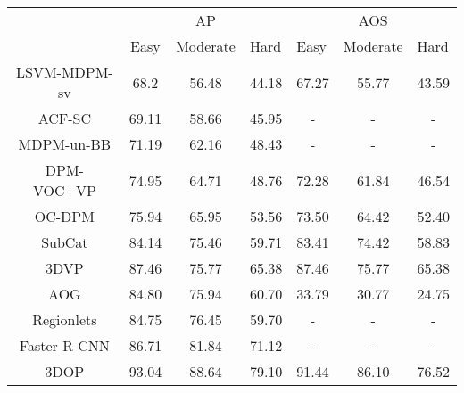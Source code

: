 \documentclass[10pt,twocolumn,letterpaper]{article}
\begin{document}
\begin{table*}[]
\centering

\begin{tabular}{c|c|c|c|l|c|c|}
\cline{2-7}
\multicolumn{1}{l|}{}&\multicolumn{3}{c|}{AP}             & \multicolumn{3}{c|}{AOS}                                                      \\ \cline{2-7} 
                         & Easy & Moderate & \multicolumn{1}{l|}{Hard} & Easy                     & \multicolumn{1}{l|}{Moderate} & \multicolumn{1}{l|}{Hard} \\ \hline
\multicolumn{1}{|c|}{LSVM-MDPM-sv \cite{Felzenszwalb10, Geiger11}} & 68.2 & 56.48 & 44.18 & \multicolumn{1}{c|}{67.27}  & 55.77 & 43.59                       \\
\multicolumn{1}{|c|}{ACF-SC \cite{cadena2015icra}} & 69.11 & 58.66 & 45.95                      & \multicolumn{1}{c|}{-} & - & -                       \\ 
\multicolumn{1}{|c|}{MDPM-un-BB \cite{Felzenszwalb10}} & 71.19 & 62.16 & 48.43                       & \multicolumn{1}{c|}{-} & - & -                   \\ 
\multicolumn{1}{|c|}{DPM-VOC+VP \cite{bojan15pami}} & 74.95 & 64.71 & 48.76                      & \multicolumn{1}{c|}{72.28} & 61.84 & 46.54                       \\ 
\multicolumn{1}{|c|}{OC-DPM \cite{bojan13cvpr}} &75.94 & 65.95 & 53.56                    & \multicolumn{1}{c|}{73.50} & 64.42 & 52.40                  \\ 
\multicolumn{1}{|c|}{SubCat \cite{subcat15}} & 84.14 & 75.46 & 59.71                      & \multicolumn{1}{c|}{83.41} & 74.42 & 58.83                     \\ 
\multicolumn{1}{|c|}{3DVP \cite{3dvp}} & 87.46 & 75.77 & 65.38                       & \multicolumn{1}{c|}{87.46} & 75.77 & 65.38                      \\ 
\multicolumn{1}{|c|}{AOG \cite{CarAOG_ECCV2014}} & 84.80 & 75.94 & 60.70                      & \multicolumn{1}{c|}{33.79} & 30.77 & 24.75                    \\ 
\multicolumn{1}{|c|}{Regionlets \cite{Regionlets-Relocalization}} & 84.75 & 76.45 & 59.70 & \multicolumn{1}{c|}{-} & - & - \\
\multicolumn{1}{|c|}{Faster R-CNN \cite{faster}} & 86.71 & 81.84 & 71.12                       & \multicolumn{1}{c|}{-} & - & -                     \\ 
\multicolumn{1}{|c|}{3DOP \cite{3dop} } & 93.04 & 88.64 & 79.10                      & \multicolumn{1}{c|}{91.44} & 86.10 & 76.52 \\

\end{tabular}
\end{table*}
\end{document}

